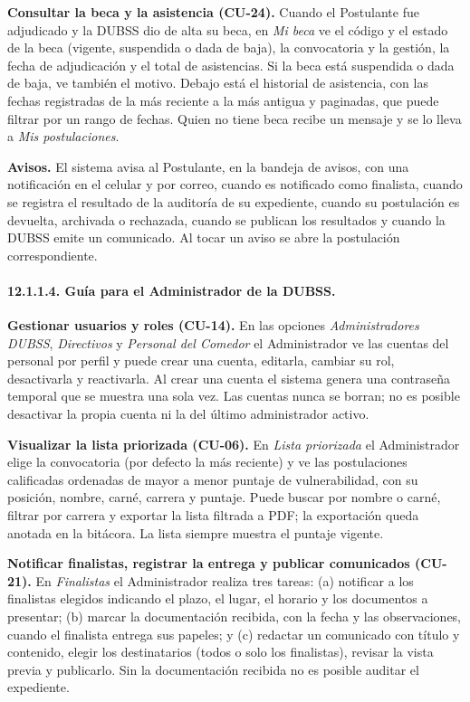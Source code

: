 \textbf{Consultar la beca y la asistencia (CU-24).} Cuando el Postulante fue adjudicado y la DUBSS dio de alta su beca, en \textit{Mi beca} ve el código y el estado de la beca (vigente, suspendida o dada de baja), la convocatoria y la gestión, la fecha de adjudicación y el total de asistencias. Si la beca está suspendida o dada de baja, ve también el motivo. Debajo está el historial de asistencia, con las fechas registradas de la más reciente a la más antigua y paginadas, que puede filtrar por un rango de fechas. Quien no tiene beca recibe un mensaje y se lo lleva a \textit{Mis postulaciones}.\par

\textbf{Avisos.} El sistema avisa al Postulante, en la bandeja de avisos, con una notificación en el celular y por correo, cuando es notificado como finalista, cuando se registra el resultado de la auditoría de su expediente, cuando su postulación es devuelta, archivada o rechazada, cuando se publican los resultados y cuando la DUBSS emite un comunicado. Al tocar un aviso se abre la postulación correspondiente.

\paragraph{12.1.1.4. Guía para el Administrador de la DUBSS.}

\textbf{Gestionar usuarios y roles (CU-14).} En las opciones \textit{Administradores DUBSS}, \textit{Directivos} y \textit{Personal del Comedor} el Administrador ve las cuentas del personal por perfil y puede crear una cuenta, editarla, cambiar su rol, desactivarla y reactivarla. Al crear una cuenta el sistema genera una contraseña temporal que se muestra una sola vez. Las cuentas nunca se borran; no es posible desactivar la propia cuenta ni la del último administrador activo.

\textbf{Visualizar la lista priorizada (CU-06).} En \textit{Lista priorizada} el Administrador elige la convocatoria (por defecto la más reciente) y ve las postulaciones calificadas ordenadas de mayor a menor puntaje de vulnerabilidad, con su posición, nombre, carné, carrera y puntaje. Puede buscar por nombre o carné, filtrar por carrera y exportar la lista filtrada a PDF; la exportación queda anotada en la bitácora. La lista siempre muestra el puntaje vigente.

\textbf{Notificar finalistas, registrar la entrega y publicar comunicados (CU-21).} En \textit{Finalistas} el Administrador realiza tres tareas: (a) notificar a los finalistas elegidos indicando el plazo, el lugar, el horario y los documentos a presentar; (b) marcar la documentación recibida, con la fecha y las observaciones, cuando el finalista entrega sus papeles; y (c) redactar un comunicado con título y contenido, elegir los destinatarios (todos o solo los finalistas), revisar la vista previa y publicarlo. Sin la documentación recibida no es posible auditar el expediente.

